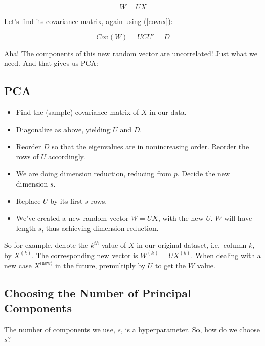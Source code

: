 \begin{equation}
W = UX
\end{equation}

Let's find its covariance matrix, again using (\ref{covax}):

\begin{equation}
Cov(W) = U C U' = D
\end{equation}

Aha!  The components of this new random vector are uncorrelated!  Just
what we need.  And that gives us PCA:

\subsection{PCA}

\begin{itemize}

\item Find the (sample) covariance matrix of $X$ in our data.

\item Diagonalize as above, yielding $U$ and $D$.

\item Reorder $D$ so that the eigenvalues are in nonincreasing order.
Reorder the rows of $U$ accordingly.

\item We are doing dimension reduction, reducing from $p$.  
Decide the new dimension $s$.

\item Replace $U$ by its first $s$ rows.

\item We've created a new random vector $W = UX$, with the new $U$.
$W$ will have length $s$, thus achieving dimension reduction.

\end{itemize} 

So for example, denote the $k^{th}$ value of $X$ in our original
dataset, i.e.\ column $k$, by $X^{(k)}$.  The corresponding new vector
is $W^{(k)} = U X^{(k)}$.  When dealing with a new case
$X^{(\textrm{new)}}$ in the future, premultiply by $U$ to get the $W$
value.


\subsection{Choosing the Number of Principal Components}  

The number of components we use, $s$, is a hyperparameter.  So, how do
we choose $s$?  

